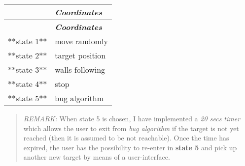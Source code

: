 \tabulinesep=1mm
\begin{longtabu} spread 0pt [c]{*2{|X[-1]}|}
\hline
{}&{\bf {\itshape Coordinates}  }\\
\endfirsthead
\hline
\endfoot
\hline
{}&{\bf {\itshape Coordinates}  }\\
\endhead
$\ast$$\ast$state 1$\ast$$\ast$ &move randomly \\
$\ast$$\ast$state 2$\ast$$\ast$ &target position \\
$\ast$$\ast$state 3$\ast$$\ast$ &walls following \\
$\ast$$\ast$state 4$\ast$$\ast$ &stop \\
$\ast$$\ast$state 5$\ast$$\ast$ &bug algorithm \\
\end{longtabu}
\begin{quote}
{\itshape R\+E\+M\+A\+RK\+:} When {\ttfamily state 5} is chosen, I have implemented a {\itshape 20 secs timer} which allows the user to exit from {\itshape bug algorithm} if the target is not yet reached (then it is assumed to be not reachable). Once the time has expired, the user has the possibility to re-\/enter in {\bfseries state 5} and pick up another new target by means of a user-\/interface. \end{quote}



